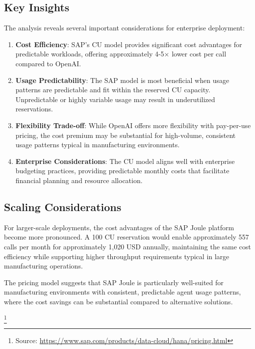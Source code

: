 \subsection{Key Insights}

The analysis reveals several important considerations for enterprise deployment:

\begin{enumerate}
    \item \textbf{Cost Efficiency}: SAP's CU model provides significant cost advantages for predictable workloads, offering approximately 4-5× lower cost per call compared to OpenAI.
    
    \item \textbf{Usage Predictability}: The SAP model is most beneficial when usage patterns are predictable and fit within the reserved CU capacity. Unpredictable or highly variable usage may result in underutilized reservations.
    
    \item \textbf{Flexibility Trade-off}: While OpenAI offers more flexibility with pay-per-use pricing, the cost premium may be substantial for high-volume, consistent usage patterns typical in manufacturing environments.
    
    \item \textbf{Enterprise Considerations}: The CU model aligns well with enterprise budgeting practices, providing predictable monthly costs that facilitate financial planning and resource allocation.
\end{enumerate}

\subsection{Scaling Considerations}

For larger-scale deployments, the cost advantages of the SAP Joule platform become more pronounced. A 100 CU reservation would enable approximately 557 calls per month for approximately 1,020 USD annually, maintaining the same cost efficiency while supporting higher throughput requirements typical in large manufacturing operations.

The pricing model suggests that SAP Joule is particularly well-suited for manufacturing environments with consistent, predictable agent usage patterns, where the cost savings can be substantial compared to alternative solutions.

\footnote{Source: \url{https://www.sap.com/products/data-cloud/hana/pricing.html}}
